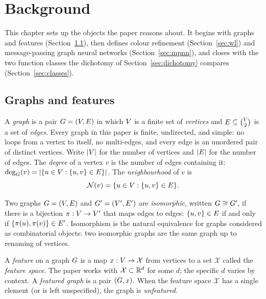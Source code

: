 
\section{Background}\label{sec:background}

This chapter sets up the objects the paper reasons about. It begins with
graphs and features (Section~\ref{sec:graphs}), then defines colour refinement
(Section~\ref{sec:wl}) and message-passing graph neural networks
(Section~\ref{sec:mpnn}), and closes with the two function classes the
dichotomy of Section~\ref{sec:dichotomy} compares (Section~\ref{sec:classes}).

\subsection{Graphs and features}\label{sec:graphs}

A \emph{graph} is a pair $G = (V, E)$ in which
$V$ is a finite set of \emph{vertices} and $E \subseteq
\binom{V}{2}$ is a set of \emph{edges}. Every graph in this
paper is finite, undirected, and simple: no loops from a vertex to
itself, no multi-edges, and every edge is an unordered pair of distinct
vertices. Write $|V|$ for the number of vertices and $|E|$
for the number of edges. The \emph{degree} of a vertex $v$ is the
number of edges containing it: $\deg_G(v) = |\{u \in V :
\{u, v\} \in E\}|$. The \emph{neighbourhood} of $v$ is
\[
\mathcal{N}(v) = \{u \in V : \{u, v\} \in E\}.
\]

Two graphs $G = (V, E)$ and $G' = (V',
E')$ are \emph{isomorphic}, written $G \cong G'$, if there
is a bijection $\pi : V \to V'$ that maps edges to
edges: $\{u, v\} \in E$ if and only if $\{\pi(u), \pi(v)\} \in
E'$. Isomorphism is the natural equivalence for graphs
considered as combinatorial objects: two isomorphic graphs are the
same graph up to renaming of vertices.

A \emph{feature} on a graph $G$ is a map $x : V \to
\mathcal{X}$ from vertices to a set $\mathcal{X}$ called the
\emph{feature space}. The paper works with $\mathcal{X} \subset \mathbb{R}^d$
for some $d$; the specific $d$ varies by context. A \emph{featured
graph} is a pair $(G, x)$. When the feature space $\mathcal{X}$ has
a single element (or is left unspecified), the graph is
\emph{unfeatured}.

